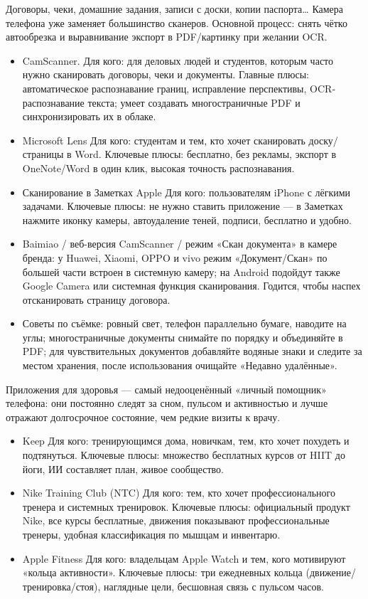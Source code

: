Договоры, чеки, домашние задания, записи с доски, копии паспорта… Камера телефона уже заменяет большинство сканеров. Основной процесс: снять чётко автообрезка и выравнивание экспорт в PDF/картинку при желании OCR.

\begin{itemize}
  \item CamScanner. Для кого: для деловых людей и студентов, которым часто нужно сканировать договоры, чеки и документы. Главные плюсы: автоматическое распознавание границ, исправление перспективы, OCR-распознавание текста; умеет создавать многостраничные PDF и синхронизировать их в облаке.
  \item Microsoft Lens Для кого: студентам и тем, кто хочет сканировать доску/страницы в Word. Ключевые плюсы: бесплатно, без рекламы, экспорт в OneNote/Word в один клик, высокая точность распознавания.
  \item Сканирование в Заметках Apple Для кого: пользователям iPhone с лёгкими задачами. Ключевые плюсы: не нужно ставить приложение — в Заметках нажмите иконку камеры, автоудаление теней, подписи, бесплатно и удобно.
  \item Baimiao / веб-версия CamScanner / режим «Скан документа» в камере бренда: у Huawei, Xiaomi, OPPO и vivo режим «Документ/Скан» по большей части встроен в системную камеру; на Android подойдут также Google Camera или системная функция сканирования. Годится, чтобы наспех отсканировать страницу договора.
  \item Советы по съёмке: ровный свет, телефон параллельно бумаге, наводите на углы; многостраничные документы снимайте по порядку и объединяйте в PDF; для чувствительных документов добавляйте водяные знаки и следите за местом хранения, после использования очищайте «Недавно удалённые».
\end{itemize}


Приложения для здоровья — самый недооценённый «личный помощник» телефона: они постоянно следят за сном, пульсом и активностью и лучше отражают долгосрочное состояние, чем редкие визиты к врачу.


\begin{itemize}
  \item Keep Для кого: тренирующимся дома, новичкам, тем, кто хочет похудеть и подтянуться. Ключевые плюсы: множество бесплатных курсов от HIIT до йоги, ИИ составляет план, живое сообщество.
  \item Nike Training Club (NTC) Для кого: тем, кто хочет профессионального тренера и системных тренировок. Ключевые плюсы: официальный продукт Nike, все курсы бесплатные, движения показывают профессиональные тренеры, удобная классификация по мышцам и инвентарю.
  \item Apple Fitness Для кого: владельцам Apple Watch и тем, кого мотивируют «кольца активности». Ключевые плюсы: три ежедневных кольца (движение/тренировка/стоя), наглядные цели, бесшовная связь с пульсом часов.
\end{itemize}

